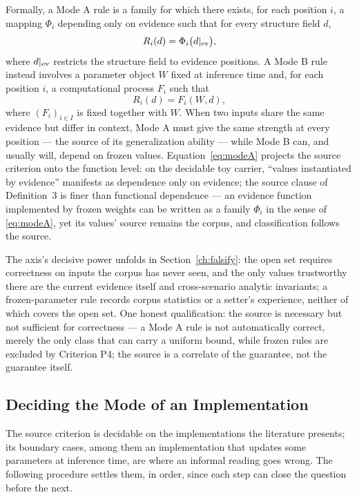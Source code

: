Formally, a Mode A rule is a family for which there exists, for each position $i$, a mapping $\Phi_i$ depending only on evidence such that for every structure field $d$,
\begin{equation}
R_i(d) = \Phi_i\bigl(d|_{\mathrm{ev}}\bigr),
\label{eq:modeA}
\end{equation}
where $d|_{\mathrm{ev}}$ restricts the structure field to evidence positions. A Mode B rule instead involves a parameter object $W$ fixed at inference time and, for each position $i$, a computational process $F_i$ such that
\begin{equation}
R_i(d) = F_i(W, d),
\label{eq:modeB}
\end{equation}
where $(F_i)_{i \in I}$ is fixed together with $W$. When two inputs share the same evidence but differ in context, Mode A must give the same strength at every position --- the source of its generalization ability --- while Mode B can, and usually will, depend on frozen values. Equation~\eqref{eq:modeA} projects the source criterion onto the function level: on the decidable toy carrier, ``values instantiated by evidence'' manifests as dependence only on evidence; the source clause of Definition~3 is finer than functional dependence --- an evidence function implemented by frozen weights can be written as a family $\Phi_i$ in the sense of \eqref{eq:modeA}, yet its values' source remains the corpus, and classification follows the source.

The axis's decisive power unfolds in Section~\ref{ch:falsify}: the open set requires correctness on inputs the corpus has never seen, and the only values trustworthy there are the current evidence itself and cross-scenario analytic invariants; a frozen-parameter rule records corpus statistics or a setter's experience, neither of which covers the open set. One honest qualification: the source is necessary but not sufficient for correctness --- a Mode A rule is not automatically correct, merely the only class that can carry a uniform bound, while frozen rules are excluded by Criterion P4; the source is a correlate of the guarantee, not the guarantee itself.

\subsection{Deciding the Mode of an Implementation}
\label{sec:procedure}

The source criterion is decidable on the implementations the literature presents; its boundary cases, among them an implementation that updates some parameters at inference time, are where an informal reading goes wrong. The following procedure settles them, in order, since each step can close the question before the next.

